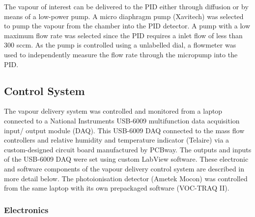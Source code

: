 \documentclass[
  a4paper,
]{scrbook}
\begin{document}
The vapour of interest can be delivered to the PID either through
diffusion or by means of a low-power pump. A micro diaphragm pump
(Xavitech) was selected to pump the vapour from the chamber into the PID
detector. A pump with a low maximum flow rate was selected since the PID
requires a inlet flow of less than 300 sccm. As the pump is controlled
using a unlabelled dial, a flowmeter was used to independently measure
the flow rate through the micropump into the PID.

\hypertarget{sec-control-system}{%
\subsection{Control System}\label{sec-control-system}}

The vapour delivery system was controlled and monitored from a laptop
connected to a National Instruments USB-6009 multifunction data
acquisition input/ output module (DAQ). This USB-6009 DAQ connected to
the mass flow controllers and relative humidity and temperature
indicator (Telaire) via a custom-designed circuit board manufactured by
PCBway. The outputs and inputs of the USB-6009 DAQ were set using custom
LabView software. These electronic and software components of the vapour
delivery control system are described in more detail below. The
photoionisation detector (Ametek Mocon) was controlled from the same
laptop with its own prepackaged software (VOC-TRAQ II).

\hypertarget{electronics}{%
\subsubsection*{Electronics}\label{electronics}}
\end{document}
